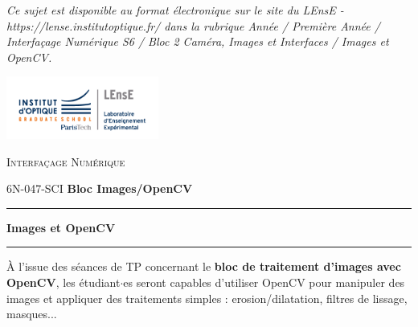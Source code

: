 \documentclass[a4paper,11pt,titlepage]{article} %
\begin{document}
\begin{titlepage}
\begin{center}
\vfill

\textit{Ce sujet est disponible au format électronique sur le site du LEnsE - https://lense.institutoptique.fr/ dans la rubrique Année / Première Année / Interfaçage Numérique S6 / Bloc 2 Caméra, Images et Interfaces / Images et OpenCV.}



\end{center}
\end{titlepage}

\newpage
\strut %

\newpage
\pagestyle{empty}

\begin{minipage}[c]{.25\linewidth}
	\includegraphics[width=5cm]{images/Logo-LEnsE.png}
\end{minipage} \hfill
\begin{minipage}[c]{.4\linewidth}

\begin{center}
\vspace{0.3cm}
{\Large \textsc{Interfaçage Numérique}}

\medskip

6N-047-SCI \qquad \textbf{\large Bloc Images/OpenCV}

\end{center}
\end{minipage}\hfill

\vspace{0.5cm}

\noindent \rule{\linewidth}{1pt}

{\noindent\Large  \rule[-7pt]{0pt}{30pt} \textbf{Images et OpenCV}}

\noindent \rule{\linewidth}{1pt}

\bigskip 


{\large À l'issue des séances de TP concernant le \textbf{bloc de traitement d'images avec OpenCV}, les étudiant$\cdot$es seront capables d'utiliser OpenCV pour manipuler des images et appliquer des traitements simples : erosion/dilatation, filtres de lissage, masques...}
\end{document}
